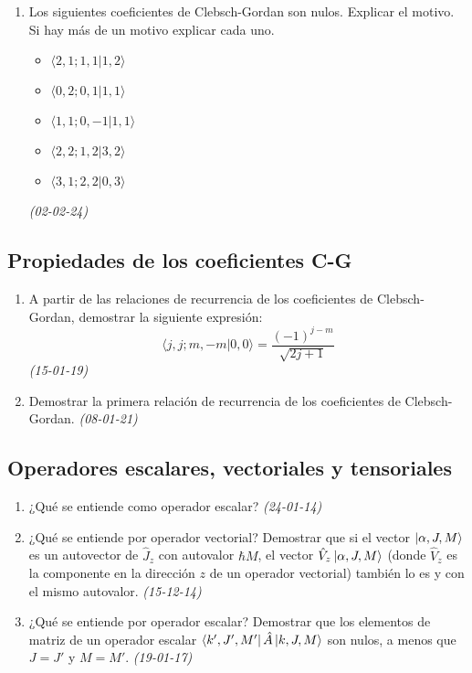 \begin{enumerate}
        \item Los siguientes coeficientes de Clebsch-Gordan son nulos. Explicar el motivo. Si hay más de un motivo explicar cada uno.
        \begin{itemize}
            \item $\langle 2, 1; 1, 1 | 1, 2 \rangle$
            \item $\langle 0, 2; 0, 1 | 1, 1 \rangle$
            \item $\langle 1, 1; 0, -1 | 1, 1 \rangle$
            \item $\langle 2, 2; 1, 2 | 3, 2 \rangle$
            \item $\langle 3, 1; 2, 2 | 0, 3 \rangle$
        \end{itemize} \textit{(02-02-24)}

\end{enumerate}

\subsection*{Propiedades de los coeficientes C-G}


\begin{enumerate}
    
    \item A partir de las relaciones de recurrencia de los coeficientes de Clebsch-Gordan, demostrar la siguiente expresión:
    \[
    \langle j, j; m, -m | 0, 0 \rangle = \frac{(-1)^{j-m}}{\sqrt{2j+1}}
    \]  \textit{(15-01-19)}

    \item Demostrar la primera relación de recurrencia de los coeficientes de Clebsch-Gordan. \textit{(08-01-21)}

\end{enumerate}

\subsection*{Operadores escalares, vectoriales y tensoriales}

\begin{enumerate}
    
    \item ¿Qué se entiende como operador escalar? \textit{(24-01-14)}     

    \item ¿Qué se entiende por operador vectorial? Demostrar que si el vector \( \ket{\alpha, J, M} \) es un autovector de \( \hat{J}_z \) con autovalor \( \hbar M \), el vector \( \hat{V}_z \ket{\alpha, J, M} \) (donde \( \hat{V}_z \) es la componente en la dirección \( z \) de un operador vectorial) también lo es y con el mismo autovalor. \textit{(15-12-14)}      
    
    
    \item ¿Qué se entiende por operador escalar? Demostrar que los elementos de matriz de un operador escalar $\bra{k', J', M'} \hat{A} \ket{k, J, M}$ son nulos, a menos que $J = J'$ y $M = M'$. \textit{(19-01-17)}     

\end{enumerate}